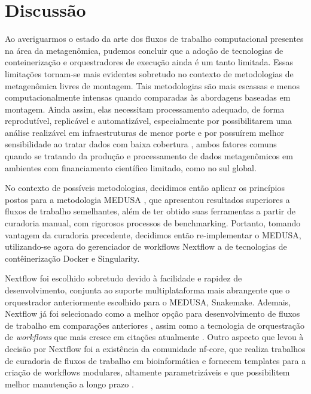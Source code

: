 \documentclass[
	12pt,				%
	oneside,			%
	a4paper,			%
	chapter=TITLE,		%
	section=TITLE,		%
	english,			%
	brazil				%
	]{abntex2}
\begin{document}
\chapter{Discussão}\label{discussuxe3o}

Ao averiguarmos o estado da arte dos fluxos de trabalho computacional presentes na área da metagenômica, pudemos concluir que a adoção de tecnologias de conteinerização e orquestradores de execução ainda é um tanto limitada. Essas limitações tornam-se mais evidentes sobretudo no contexto de metodologias de metagenômica livres de montagem. Tais metodologias são mais escassas e menos computacionalmente intensas quando comparadas às abordagens baseadas em montagem. Ainda assim, elas necessitam processamento adequado, de forma reprodutível, replicável e automatizável, especialmente por possibilitarem uma análise realizável em infraestruturas de menor porte e por possuírem melhor sensibilidade ao tratar dados com baixa cobertura \autocite{ayling2020}, ambos fatores comuns quando se tratando da produção e processamento de dados metagenômicos em ambientes com financiamento científico limitado, como no sul global.

No contexto de possíveis metodologias, decidimos então aplicar os princípios postos para a metodologia MEDUSA \autocite{morais2022}, que apresentou resultados superiores a fluxos de trabalho semelhantes, além de ter obtido suas ferramentas a partir de curadoria manual, com rigorosos processos de benchmarking. Portanto, tomando vantagem da curadoria precedente, decidimos então re-implementar o MEDUSA, utilizando-se agora do gerenciador de workflows Nextflow a de tecnologias de contêinerização Docker e Singularity.

Nextflow foi escolhido sobretudo devido à facilidade e rapidez de desenvolvimento, conjunta ao suporte multiplataforma mais abrangente que o orquestrador anteriormente escolhido para o MEDUSA, Snakemake. Ademais, Nextflow já foi selecionado como a melhor opção para desenvolvimento de fluxos de trabalho em comparações anteriores \autocite{jackson2021} \autocite{celebi2023}, assim como a tecnologia de orquestração de \emph{workflows} que mais cresce em citações atualmente \autocite{langerEmpoweringBioinformaticsCommunities2024}. Outro aspecto que levou à decisão por Nextflow foi a existência da comunidade nf-core, que realiza trabalhos de curadoria de fluxos de trabalho em bioinformática e fornecem templates para a criação de workflows modulares, altamente parametrizáveis e que possibilitem melhor manutenção a longo prazo \autocite{ewels2020}.
\end{document}
